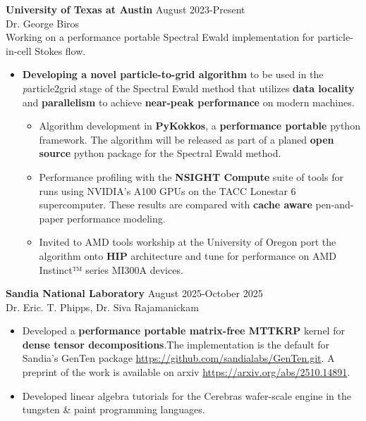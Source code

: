 \documentclass[resmargin, 10pt]{res} %
\begin{document}
\begin{resume}
{\bf University of Texas at Austin} \hfill August 2023-Present \\
Dr. George Biros \\
Working on a performance portable Spectral Ewald implementation for particle-in-cell Stokes flow.
\begin{itemize}[itemsep=0em]
    \item {\bf Developing a novel particle-to-grid algorithm} to be used in the {\emph particle2grid} stage of the Spectral Ewald method that utilizes {\bf data locality} and {\bf parallelism} to achieve {\bf near-peak performance} on modern machines.  
    \begin{itemize}[itemsep=0em]
        \item Algorithm development in {\bf PyKokkos}, a {\bf performance portable} python framework. The algorithm will be released as part of a planed {\bf open source} python package for the Spectral Ewald method. 
        \item Performance profiling with the {\bf NSIGHT Compute} suite of tools for runs using NVIDIA's A100 GPUs on the TACC Lonestar 6 supercomputer. These results are compared with {\bf cache aware} pen-and-paper performance modeling.
        \item Invited to AMD tools workship at the University of Oregon port the algorithm onto {\bf HIP} architecture and tune for performance on AMD Instinct™ series MI300A devices. 
    \end{itemize}
\end{itemize}

{\bf Sandia National Laboratory} \hfill August 2025-October 2025 \\
Dr. Eric. T. Phipps, Dr. Siva Rajamanickam
\begin{itemize}[itemsep=0em]
	\item Developed a {\bf performance portable matrix-free MTTKRP} kernel for {\bf dense tensor decompositions}.The implementation is the default for Sandia's GenTen package \url{https://github.com/sandialabs/GenTen.git}. A preprint of the work is available on arxiv \url{https://arxiv.org/abs/2510.14891}.
	\item Developed linear algebra tutorials for the Cerebras wafer-scale engine in the tungsten \& paint programming languages.
\end{itemize}


\end{resume}
\end{document}
